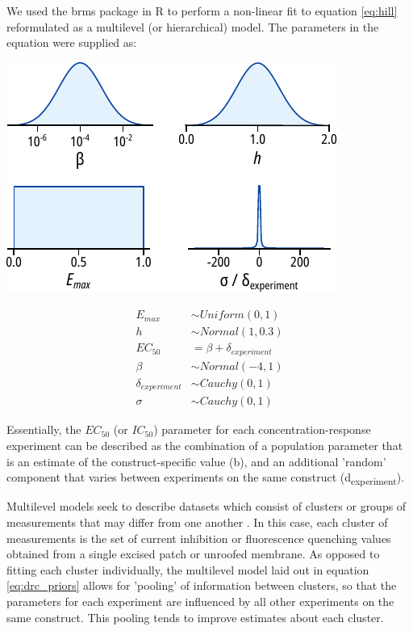 We used the brms package in R to perform a non-linear fit to equation \ref{eq:hill} reformulated as a multilevel (or hierarchical) model.
The parameters in the equation were supplied as:

\begin{minipage}{.5\textwidth}
\centering
\includegraphics[width=\textwidth]{drc_priors.pdf}
\end{minipage}
\begin{minipage}{.5\textwidth}
\centering
\begin{equation} \label{eq:drc_priors}
\begin{split}
E_{max} &\sim Uniform(0, 1) \\
h &\sim Normal(1, 0.3) \\
EC_{50} &= \beta + \delta_{experiment} \\
\beta &\sim Normal(-4, 1) \\
\delta_{experiment} &\sim Cauchy(0, 1) \\
\sigma &\sim Cauchy(0, 1)
\end{split}
\end{equation}
\end{minipage}

Essentially, the $EC_{50}$ (or $IC_{50}$) parameter for each concentration-response experiment can be described as the combination of a population parameter that is an estimate of the construct-specific value (\textgreek{b}), and an additional 'random' component that varies between experiments on the same construct (\textgreek{d}\textsubscript{experiment}).

Multilevel models seek to describe datasets which consist of clusters or groups of measurements that may differ from one another \cite{andrew_gelman_bayesian_2014, mcelreath_statistical_2020}.
In this case, each cluster of measurements is the set of current inhibition or fluorescence quenching values obtained from a single excised patch or unroofed membrane.
As opposed to fitting each cluster individually, the multilevel model laid out in equation \ref{eq:drc_priors} allows for 'pooling' of information between clusters, so that the parameters for each experiment are influenced by all other experiments on the same construct.
This pooling tends to improve estimates about each cluster.

